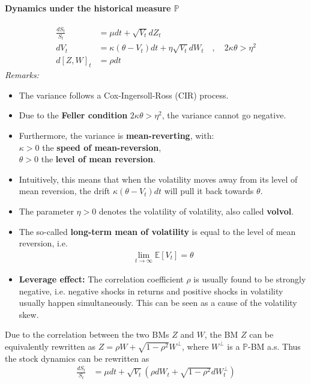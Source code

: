 \documentclass[a4paper,landscape,7pt,fleqn]{scrartcl}
\renewcommand{\emph}[1]{\textbf{#1}}
\begin{document}
\begin{multicols*}{3}
\paragraph{Dynamics under the historical measure $\mathbb{P}$}
\begin{align*}
\frac{dS_t}{S_t} &= \mu dt + \sqrt{V_t} dZ_t \\
dV_t &= \kappa (\theta - V_t) dt + \eta \sqrt{V_t} dW_t \quad , \quad 2 \kappa \theta > \eta^2 \\
d[Z,W]_t &= \rho dt
\end{align*}
\textit{Remarks:}
\begin{itemize}
\item The variance follows a Cox-Ingersoll-Ross (CIR) process.
\item Due to the \emph{Feller condition} $2 \kappa \theta > \eta^2$, the variance cannot go negative.
\item Furthermore, the variance is \emph{mean-reverting}, with: \\
$\kappa>0$ the \emph{speed of mean-reversion}, \\
$\theta>0$ the \emph{level of mean reversion}.
\item Intuitively, this means that when the volatility moves away from its level of mean reversion, the drift $\kappa (\theta - V_t) dt$ will pull it back towards $\theta$.
\item The parameter $\eta>0$ denotes the volatility of volatility, also called \emph{volvol}.
\item The so-called \emph{long-term mean of volatility} is equal to the level of mean reversion, i.e.
\begin{align*}
\lim \limits_{t \rightarrow \infty} \mathbb{E}[V_t] = \theta
\end{align*}
\item \emph{Leverage effect:} The correlation coefficient $\rho$ is usually found to be strongly negative, i.e. negative shocks in returns and positive shocks in volatility usually happen simultaneously. This can be seen as a cause of the volatility skew.
\end{itemize}
Due to the correlation between the two BMs $Z$ and $W$, the BM $Z$ can be equivalently rewritten as $Z = \rho W + \sqrt{1-\rho^2} W^\bot$, where $W^\bot$ is a $\mathbb{P}$-BM a.s. Thus the stock dynamics can be rewritten as
\begin{align*}
\frac{dS_t}{S_t} &= \mu dt + \sqrt{V_t} \left( \rho dW_t + \sqrt{1-\rho^2} dW_t^\bot \right)
\end{align*}


\end{multicols*}
\end{document}
